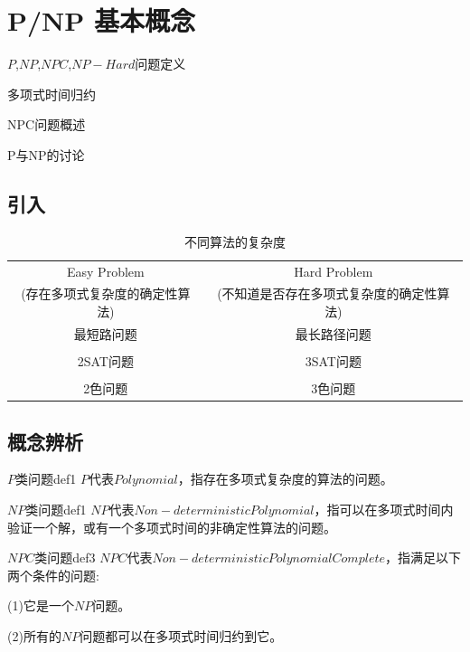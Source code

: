 	
	\chapter{P/NP 基本概念}
	
	\begin{introduction}
		\item $P$,$NP$,$NPC$,$NP-Hard$问题定义
		\item 多项式时间归约
		\item NPC问题概述
		\item P与NP的讨论
	\end{introduction}
	
	\section{引入}
	\begin{table}[!htbp]
		\centering
		\caption{不同算法的复杂度}
		\begin{tabular}{cc}
			\toprule[0.5mm]
			Easy Problem & Hard Problem\\
			(存在多项式复杂度的确定性算法)&(不知道是否存在多项式复杂度的确定性算法)\\
			\midrule[0.4mm]
			最短路问题&最长路径问题\\ \\
			2SAT问题&3SAT问题\\ \\
			2色问题&3色问题\\ 
			\bottomrule
		\end{tabular}
	\end{table}
	
	\section{概念辨析}
	\begin{definition}{$P$类问题}{def1}
	$P$代表$Polynomial$，指存在多项式复杂度的算法的问题。
	\end{definition}

	\begin{definition}{$NP$类问题}{def1}
	$NP$代表$Non-deterministic Polynomial$，指可以在多项式时间内验证一个解，或有一个多项式时间的非确定性算法的问题。
	\end{definition}

	\begin{definition}{$NPC$类问题}{def3}
	$NPC$代表$Non-deterministic Polynomial Complete$，指满足以下两个条件的问题:
	
	(1)它是一个$NP$问题。
	
	(2)所有的$NP$问题都可以在多项式时间归约到它。
	\end{definition}

